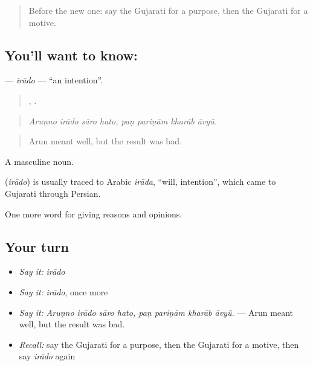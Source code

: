 \begin{quote}
Before the new one: say the Gujarati for a purpose, then the Gujarati for a motive.
\end{quote}

\subsection*{You'll want to know: }
\textbf{} — \emph{irādo} — \textquotedblleft{}an intention\textquotedblright{}.

\begin{quote}
   ,    .
\end{quote}

\begin{quote}
\emph{Aruṇno irādo sāro hato, paṇ pariṇām kharāb āvyũ.}
\end{quote}

\begin{quote}
Arun meant well, but the result was bad.
\end{quote}

A masculine noun.

\begin{cousinweb}
\textbf{} (\emph{irādo}) is usually traced to Arabic \emph{irāda}, \textquotedblleft{}will, intention\textquotedblright{}, which came to Gujarati through Persian.
\end{cousinweb}

\begin{grammarlens}[title={What you've built}]
One more word for giving reasons and opinions.
\end{grammarlens}

\subsection*{Your turn}
\begin{itemize}
\raggedright
  \item \emph{Say it:} \emph{irādo}
  \item \emph{Say it:} \emph{irādo}, once more
  \item \emph{Say it:} \emph{Aruṇno irādo sāro hato, paṇ pariṇām kharāb āvyũ.} — Arun meant well, but the result was bad.
  \item \emph{Recall:} say the Gujarati for a purpose, then the Gujarati for a motive, then say \emph{irādo} again
\end{itemize}

